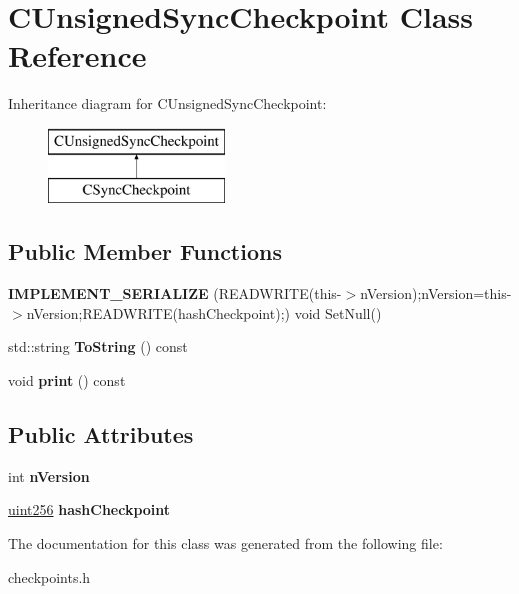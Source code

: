 \hypertarget{class_c_unsigned_sync_checkpoint}{}\section{C\+Unsigned\+Sync\+Checkpoint Class Reference}
\label{class_c_unsigned_sync_checkpoint}
Inheritance diagram for C\+Unsigned\+Sync\+Checkpoint\+:\begin{figure}[H]
\begin{center}
\leavevmode
\includegraphics[height=2.000000cm]{class_c_unsigned_sync_checkpoint}
\end{center}
\end{figure}
\subsection*{Public Member Functions}
\begin{DoxyCompactItemize}
\item 
\mbox{\label{class_c_unsigned_sync_checkpoint_a85231485d158640eacf3b5d627cd57f4}} 
{\bfseries I\+M\+P\+L\+E\+M\+E\+N\+T\+\_\+\+S\+E\+R\+I\+A\+L\+I\+ZE} (R\+E\+A\+D\+W\+R\+I\+TE(this-\/$>$n\+Version);n\+Version=this-\/$>$n\+Version;R\+E\+A\+D\+W\+R\+I\+TE(hash\+Checkpoint);) void Set\+Null()
\item 
\mbox{\label{class_c_unsigned_sync_checkpoint_a9d95f52ca96711e0d815aef2f5aa9839}} 
std\+::string {\bfseries To\+String} () const
\item 
\mbox{\label{class_c_unsigned_sync_checkpoint_a9d37cd7eb87b2e827ef72817f5b4f160}} 
void {\bfseries print} () const
\end{DoxyCompactItemize}
\subsection*{Public Attributes}
\begin{DoxyCompactItemize}
\item 
\mbox{\label{class_c_unsigned_sync_checkpoint_ab11a40acdc38d53f2fd3b18d02444001}} 
int {\bfseries n\+Version}
\item 
\mbox{\label{class_c_unsigned_sync_checkpoint_ad069294c3d71ce6a91bb42ecf79e9277}} 
\mbox{\hyperlink{classuint256}{uint256}} {\bfseries hash\+Checkpoint}
\end{DoxyCompactItemize}


The documentation for this class was generated from the following file\+:\begin{DoxyCompactItemize}
\item 
checkpoints.\+h\end{DoxyCompactItemize}
